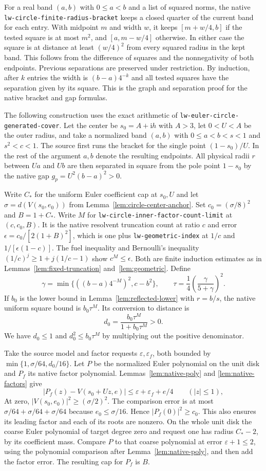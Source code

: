 \documentclass[11pt]{amsart}
\theoremstyle{definition}
\theoremstyle{remark}
\numberwithin{equation}{section}
\newcommand{\code}[1]{\nolinkurl{#1}}
\begin{document}
For a real band $(a,b)$ with $0\le a<b$ and a list of
squared norms, the native \code{lw-circle-finite-radius-bracket}
keeps a closed quarter of the current band for each entry.
With midpoint $m$ and width $w$, it keeps $[m+w/4,b]$
if the tested square is at most $m^2$, and $[a,m-w/4]$
otherwise. In either case the square is at distance at
least $(w/4)^2$ from every squared radius in the kept band.
This follows from the difference of squares and the
nonnegativity of both endpoints. Previous separations are
preserved under restriction. By induction, after $k$ entries
the width is $(b-a)4^{-k}$ and all tested squares have the
separation given by its square. This is the graph and
separation proof for the native bracket and gap formulas.

The following construction uses the exact arithmetic of
\code{lw-euler-circle-generated-cover}. Let the center be
$s_0=A+\mathrm i h$ with $A>3$, let $0<U<A$ be the outer
radius, and take a normalized band $(a,b)$ with
$0\le a<b<s<1$ and $s^2<c<1$. The source first runs
the bracket for the single point $(1-s_0)/U$.
In the rest of the argument $a,b$ denote the resulting
endpoints. All physical radii $r$ between $Ua$ and $Ub$
are then separated in square from the pole point $1-s_0$
by the native gap $g_p=U^2(b-a)^2>0$.

Write $C_*$ for the uniform Euler coefficient cap at
$s_0,U$ and let $\sigma=d(V(s_0,e_0))$ from
Lemma~\ref{lem:circle-center-anchor}. Set $c_0=(\sigma/8)^2$ and
$B=1+C_*$. Write $M$ for
\code{lw-circle-inner-factor-count-limit} at $(c,c_0,B)$.
It is the native resolvent truncation count at ratio $c$ and
error $\epsilon=c_0/[2(1+B)^2]$, which is one plus
\code{lw-geometric-index} at $1/c$ and $1/[\epsilon(1-c)]$.
The fuel inequality and Bernoulli's inequality
$(1/c)^j\ge1+j(1/c-1)$ show $c^M\le\epsilon$.
Both are finite induction estimates as in
Lemmas~\ref{lem:fixed-truncation} and~\ref{lem:geometric}.
Define
\[
 \gamma=\min\{((b-a)4^{-M})^2,c-b^2\},\qquad
 \tau=\frac14\left(\frac{\gamma}{5+\gamma}\right)^2.
\]
If $b_0$ is the lower bound in Lemma~\ref{lem:reflected-lower}
with $r=b/s$, the native uniform square bound is
$b_0\tau^M$. Its conversion to distance is
\[
       d_0=\frac{b_0\tau^M}{1+b_0\tau^M}>0 .
\]
We have $d_0\le1$ and $d_0^2\le b_0\tau^M$ by multiplying
out the positive denominator.

Take the source model and factor requests
$\varepsilon,\varepsilon_f$, both bounded by
$\min\{1,\sigma/64,d_0/16\}$.
Let $P$ be the normalized Euler polynomial on the unit
disk and $P_f$ its native factor polynomial.
Lemmas~\ref{lem:native-poly} and
\ref{lem:native-factors} give
\[
 |P_f(z)-V(s_0+Uz,e)|\le\varepsilon+\varepsilon_f+e/4
       \qquad (|z|\le1),
\]
At zero, $|V(s_0,e_0)|^2\ge(\sigma/2)^2$.
The comparison error is at most
$\sigma/64+\sigma/64+\sigma/64$ because $e_0\le\sigma/16$.
Hence $|P_f(0)|^2\ge c_0$. This also ensures its leading
factor and each of its roots are nonzero.
On the whole unit disk the coarse Euler polynomial of target
degree zero and request one has radius $C_*-2$, by its
coefficient mass. Compare $P$ to that coarse polynomial at
error $\varepsilon+1\le2$, using the polynomial comparison
after Lemma~\ref{lem:native-poly}, and then add the factor
error. The resulting cap for $P_f$ is $B$.
\end{document}
